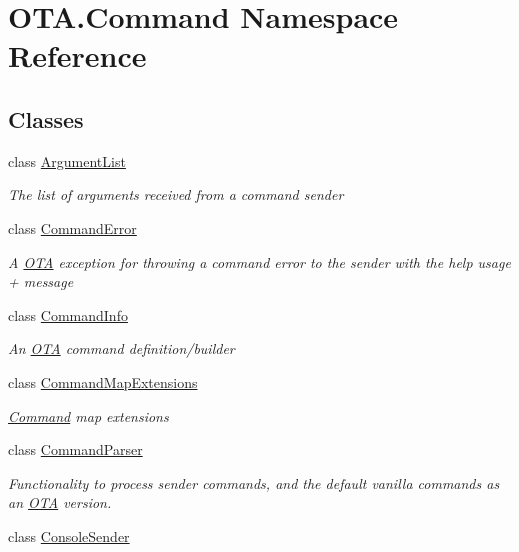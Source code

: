 \hypertarget{namespaceOTA_1_1Command}{}\section{O\+T\+A.\+Command Namespace Reference}
\label{namespaceOTA_1_1Command}
\subsection*{Classes}
\begin{DoxyCompactItemize}
\item 
class \hyperlink{classOTA_1_1Command_1_1ArgumentList}{Argument\+List}
\begin{DoxyCompactList}\small\item\em The list of arguments received from a command sender \end{DoxyCompactList}\item 
class \hyperlink{classOTA_1_1Command_1_1CommandError}{Command\+Error}
\begin{DoxyCompactList}\small\item\em A \hyperlink{namespaceOTA}{O\+T\+A} exception for throwing a command error to the sender with the help usage + message \end{DoxyCompactList}\item 
class \hyperlink{classOTA_1_1Command_1_1CommandInfo}{Command\+Info}
\begin{DoxyCompactList}\small\item\em An \hyperlink{namespaceOTA}{O\+T\+A} command definition/builder \end{DoxyCompactList}\item 
class \hyperlink{classOTA_1_1Command_1_1CommandMapExtensions}{Command\+Map\+Extensions}
\begin{DoxyCompactList}\small\item\em \hyperlink{namespaceOTA_1_1Command}{Command} map extensions \end{DoxyCompactList}\item 
class \hyperlink{classOTA_1_1Command_1_1CommandParser}{Command\+Parser}
\begin{DoxyCompactList}\small\item\em Functionality to process sender commands, and the default vanilla commands as an \hyperlink{namespaceOTA}{O\+T\+A} version. \end{DoxyCompactList}\item 
class \hyperlink{classOTA_1_1Command_1_1ConsoleSender}{Console\+Sender}

\end{DoxyCompactItemize}
